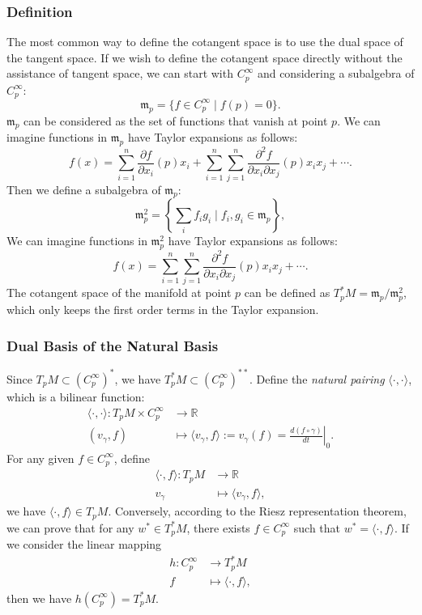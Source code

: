 \documentclass{report}
\begin{document}
\subsubsection{Definition}
The most common way to define the cotangent space is to use the dual space of the tangent space.
If we wish to define the cotangent space directly without the assistance of tangent space, we can start with $C^\infty_p$ and considering a subalgebra of $C^\infty_p$:
\[
    \mathfrak{m}_p=\{f\in C^\infty_p\mid f(p)=0\}.
\]
$\mathfrak{m}_p$ can be considered as the set of functions that vanish at point $p$. We can imagine functions in $\mathfrak{m}_p$ have Taylor expansions as follows:
\[
    f(x)=\sum_{i=1}^n\frac{\partial f}{\partial x_i}(p)x_i+\sum_{i=1}^n\sum_{j=1}^n\frac{\partial^2 f}{\partial x_i\partial x_j}(p)x_ix_j+\cdots.
\] 
Then we define a subalgebra of $\mathfrak{m}_p$:
\[
    \mathfrak{m}^2_p=\left\{\sum_if_ig_i\mid f_i, g_i\in \mathfrak{m}_p\right\},
\]
We can imagine functions in $\mathfrak{m}_p^2$ have Taylor expansions as follows:
\[
    f(x)=\sum_{i=1}^n\sum_{j=1}^n\frac{\partial^2 f}{\partial x_i\partial x_j}(p)x_ix_j+\cdots.
\] 
The cotangent space of the manifold at point $p$ can be defined as $T_p^*M=\mathfrak{m}_p/\mathfrak{m}^2_p$, which only keeps the first order terms in the Taylor expansion.

\subsubsection{Dual Basis of the Natural Basis}
Since $T_pM\subset \left(C^\infty_p\right)^*$, we have $T_p^*M\subset \left(C^\infty_p\right)^{**}$. Define the \emph{natural pairing} $\langle\cdot,\cdot\rangle$, which is a bilinear function:
\[
    \begin{aligned}
    \langle\cdot,\cdot\rangle:T_pM\times C^\infty_p&\longrightarrow\mathbb{R}\\
    (v_\gamma,f)&\longmapsto\langle v_\gamma,f\rangle:=v_\gamma(f)=\left.\frac{d(f\circ \gamma)}{dt}\right|_{0}.
    \end{aligned}
\]
For any given $f\in C^\infty_p$, define
\[
    \begin{aligned}
        \langle\cdot,f\rangle:T_pM&\longrightarrow\mathbb{R}\\
        v_\gamma&\longmapsto\langle v_\gamma,f\rangle,
    \end{aligned}
\]
we have $\langle\cdot,f\rangle\in T_pM$. Conversely, according to the Riesz representation theorem, we can prove that for any $w^*\in T_p^*M$, there exists $f\in C^\infty_p$ such that $w^*=\langle\cdot,f\rangle$. If we consider the linear mapping
\[
    \begin{aligned}
        h:C^\infty_p&\longrightarrow T_p^*M\\
        f&\longmapsto\langle\cdot,f\rangle,
    \end{aligned}
\]
then we have $h(C^\infty_p)=T_p^*M$.
\end{document}
